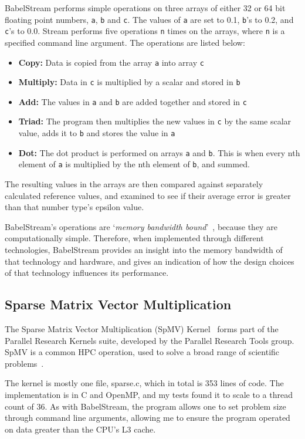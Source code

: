 BabelStream performs simple operations on three arrays of either 32 or 64 bit floating point numbers, \texttt{a}, \texttt{b} and \texttt{c}. The values of \texttt{a} are set to 0.1, \texttt{b}'s to 0.2, and \texttt{c}'s to 0.0. Stream performs five operations \texttt{n} times on the arrays, where \texttt{n} is a specified command line argument. The operations are listed below:
\begin{itemize}
  \item \textbf{Copy:} Data is copied from the array \texttt{a} into array \texttt{c}
  \item \textbf{Multiply:} Data in \texttt{c} is multiplied by a scalar and stored in \texttt{b}
  \item \textbf{Add:} The values in \texttt{a} and \texttt{b} are added together and stored in \texttt{c}
  \item \textbf{Triad:} The program then multiplies the new values in \texttt{c} by the same scalar value, adds it to \texttt{b} and stores the value in \texttt{a}
  \item \textbf{Dot:} The dot product is performed on arrays \texttt{a} and \texttt{b}. This is when every nth element of \texttt{a} is multiplied by the nth element of \texttt{b}, and summed.
\end{itemize}
The resulting values in the arrays are then compared against separately calculated reference values, and examined to see if their average error is greater than that number type's epsilon value.

BabelStream's operations are `\textit{memory bandwidth bound}'~\cite{BabelStream}, because they are computationally simple. Therefore, when implemented through different technologies, BabelStream provides an insight into the memory bandwidth of that technology and hardware, and gives an indication of how the design choices of that technology influences its performance.

\subsection{Sparse Matrix Vector Multiplication}

The Sparse Matrix Vector Multiplication (SpMV) Kernel~\cite{ParResSparse} forms part of the Parallel Research Kernels suite, developed by the Parallel Research Tools group. SpMV is a common HPC operation, used to solve a broad range of scientific problems~\cite{Sedaghati:2015, spMVGPU, DBLP:journals}.

The kernel is mostly one file, sparse.c, which in total is 353 lines of code. The implementation is in C and OpenMP, and my tests found it to scale to a thread count of 36. As with BabelStream, the program allows one to set problem size through command line arguments, allowing me to ensure the program operated on data greater than the CPU's L3 cache.

